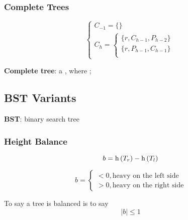   \subsubsection{Complete Trees}

    \begin{equation}
      \begin{cases}
        C_{-1} = \{ \} \\
        C_{h} =
        \begin{cases}
          \{r, C_{h - 1}, P_{h - 2} \} \\
          \{r, P_{h - 1}, C_{h - 1} \} \\
        \end{cases}
      \end{cases}
    \end{equation}

    \begin{definition}
      \textbf{Complete tree}: a , where ;
    \end{definition}

\subsection{BST Variants}

  \textbf{BST}: binary search tree

  \subsubsection{Height Balance}

    \begin{equation}
      b = \operatorname{h} \left( T_{r} \right) - \operatorname{h} \left( T_{l} \right)
    \end{equation}

    \begin{equation}
      b =
      \begin{cases}
        < 0, \text{heavy on the left side} \\
        > 0, \text{heavy on the right side}
      \end{cases}
    \end{equation}

    \begin{definition}
      To say a tree is balanced is to say
      \begin{equation}
        \left| b \right| \leq 1
      \end{equation}
    \end{definition}

